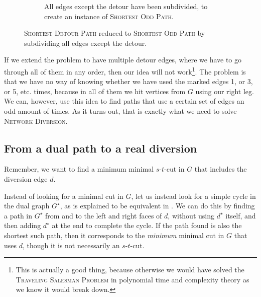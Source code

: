 \begin{figure}[H]
\begin{subfigure}{.45\textwidth}
{
        }
        \caption{All edges except the detour have been subdivided, to create an instance of \textsc{Shortest Odd Path}.}
        \label{figure:subdivided-detour}
    \end{subfigure}%
    \caption{\textsc{Shortest Detour Path} reduced to \textsc{Shortest Odd Path} by subdividing all edges except the detour.}
    \label{figure:subdividing-detours}
\end{figure}

If we extend the problem to have multiple detour edges, where we have to go through all of them in any order, then our idea will not work\footnote{This is actually a good thing, because otherwise we would have solved the \textsc{Traveling Salesman Problem} in polynomial time and complexity theory as we know it would break down.}.
The problem is that we have no way of knowing whether we have used the marked edges 1, or 3, or 5, etc. times, because in all of them we hit vertices from $G$ using our right leg. We can, however, use this idea to find paths that use a certain set of edges an odd amount of times. As it turns out, that is exactly what we need to solve \textsc{Network Diversion}.

\subsection{From a dual path to a real diversion}
Remember, we want to find a minimum minimal $s$-$t$-cut in $G$ that includes the diversion edge $d$.

Instead of looking for a minimal cut in $G$, let us instead look for a simple cycle in the dual graph $G^\star$, as is explained to be equivalent in . We can do this by finding a path in $G^\star$ from and to the left and right faces of $d$, without using $d^\star$ itself, and then adding $d^\star$ at the end to complete the cycle. If the path found is also the shortest such path, then it corresponds to the \emph{minimum} minimal cut in $G$ that uses $d$, though it is not necessarily an $s$-$t$-cut.

